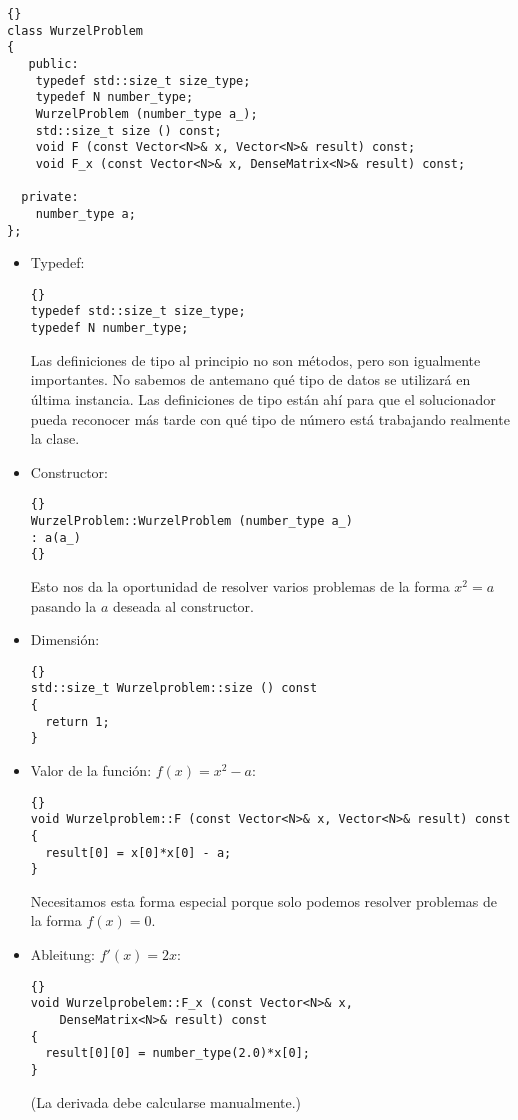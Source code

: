 \documentclass[a4paper,11pt]{article}
\theoremstyle{definition}
\begin{document}
{\footnotesize{\begin{lstlisting}{}
class WurzelProblem
{
   public:
    typedef std::size_t size_type;
    typedef N number_type;
    WurzelProblem (number_type a_);
    std::size_t size () const;
    void F (const Vector<N>& x, Vector<N>& result) const;
    void F_x (const Vector<N>& x, DenseMatrix<N>& result) const;

  private:
    number_type a;
};
\end{lstlisting}}}


\begin{itemize}
\item Typedef:

  {\footnotesize{\begin{lstlisting}{}
typedef std::size_t size_type;
typedef N number_type;
\end{lstlisting}}}

Las definiciones de tipo al principio no son métodos, pero son igualmente importantes. 
No sabemos de antemano qué tipo de datos se utilizará en última instancia. Las definiciones 
de tipo están ahí para que el solucionador pueda reconocer más tarde con qué tipo de 
número está trabajando realmente la clase.


\item Constructor:
  {\footnotesize{\begin{lstlisting}{}
WurzelProblem::WurzelProblem (number_type a_)
: a(a_)
{}
\end{lstlisting}}}

Esto nos da la oportunidad de resolver varios problemas de la forma 
$x^2=a$ pasando la $a$ deseada al constructor.

\item Dimensión:

  {\footnotesize{\begin{lstlisting}{}
std::size_t Wurzelproblem::size () const
{
  return 1;
}
\end{lstlisting}}}

\item Valor de la función: $f(x)=x^2-a$:

  {\footnotesize{\begin{lstlisting}{}
void Wurzelproblem::F (const Vector<N>& x, Vector<N>& result) const
{
  result[0] = x[0]*x[0] - a;
}
\end{lstlisting}}}

Necesitamos esta forma especial porque solo podemos resolver problemas de la forma $f (x) = 0$.


\item Ableitung: $f'(x)=2x$:
  {\footnotesize{\begin{lstlisting}{}
void Wurzelprobelem::F_x (const Vector<N>& x,
    DenseMatrix<N>& result) const
{
  result[0][0] = number_type(2.0)*x[0];
}
\end{lstlisting}}}
(La derivada debe calcularse manualmente.)
\end{itemize}
\end{document}
